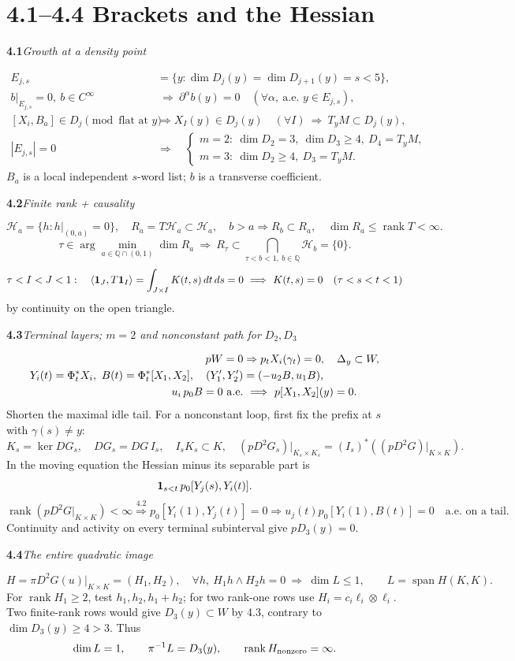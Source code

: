 \documentclass[11pt]{article}
\newcommand{\cH}{\mathcal H}
\newcommand{\rk}{\operatorname{rank}}
\newcommand{\rowhead}[2]{\par\medskip\noindent\textbf{#1}\quad\textit{#2}\par}
\newcommand{\newpart}[1]{\clearpage\section*{#1}}
\begin{document}
\newpart{4.1--4.4 \quad Brackets and the Hessian}
\rowhead{4.1}{Growth at a density point}
\begin{align*}
 E_{j,s}&=\{y:\dim D_j(y)=\dim D_{j+1}(y)=s<5\},\\
 b|_{E_{j,s}}=0,\ b\in C^\infty
 &\ \Longrightarrow\ \partial^\alpha b(y)=0
 \quad(\forall\alpha,\ \text{a.e. }y\in E_{j,s}),\\
 [X_i,B_a]\in D_j\pmod{\text{flat at }y}
 &\Longrightarrow X_I(y)\in D_j(y)\quad(\forall I)
 \ \Longrightarrow\ T_yM\subset D_j(y),\\
 |E_{j,s}|=0\quad&\Longrightarrow\quad
 \begin{cases}
 m=2:\ \dim D_2=3,\ \dim D_3\ge4,\ D_4=T_yM,\\
 m=3:\ \dim D_2\ge4,\ D_3=T_yM .
 \end{cases}
\end{align*}
$B_a$ is a local independent $s$-word list; $b$ is a transverse coefficient.
\rowhead{4.2}{Finite rank + causality}
\[
 \cH_a=\{h:h|_{(0,a)}=0\},\quad R_a=T\cH_a\subset\cH_a,\quad
 b>a\Rightarrow R_b\subset R_a,\quad \dim R_a\le\rk T<\infty .
\]
\[
 \tau\in\arg\min_{a\in\mathbb Q\cap(0,1)}\dim R_a
 \ \Longrightarrow\ R_\tau\subset\bigcap_{\tau<b<1,\ b\in\mathbb Q}\cH_b=\{0\}.
\]
\[
 \tau<I<J<1:\quad\langle{\bf1}_J,T{\bf1}_I\rangle
  =\int_{J\times I} K(t,s)\,dt\,ds=0
  \ \Longrightarrow\ K(t,s)=0\quad(\tau<s<t<1)
\]
by continuity on the open triangle.
\rowhead{4.3}{Terminal layers; $m=2$ and nonconstant path for $D_2,D_3$}
\begin{align*}
 pW=0&\Rightarrow p_tX_i(\gamma_t)=0,\quad \Delta_y\subset W,\\
 Y_i(t)=\Phi_t^*X_i,\ B(t)=\Phi_t^*[X_1,X_2],\quad
 (Y_1',Y_2')&=(-u_2B,u_1B),\\
 u_i\,p_0 B=0\ {\rm a.e.}&\ \Longrightarrow\ p[X_1,X_2](y)=0 .
\end{align*}
Shorten the maximal idle tail. For a nonconstant loop, first fix the prefix at
$s$ with $\gamma(s)\ne y$:
\[
 K_s=\ker DG_s,\quad DG_s=DG\,I_s,\quad I_s K_s\subset K,\quad
 (pD^2G_s)|_{K_s\times K_s}=(I_s)^*((pD^2G)|_{K\times K}).
\]
In the moving equation the Hessian minus its separable part is
\[
 {\bf1}_{s<t}\,p_0[Y_j(s),Y_i(t)] .
\]
\[
 \rk(pD^2G|_{K\times K})<\infty\overset{4.2}{\Longrightarrow}
 p_0[Y_i(1),Y_j(t)]=0
 \Longrightarrow u_j(t)p_0[Y_i(1),B(t)]=0\quad\text{a.e. on a tail}.
\]
Continuity and activity on every terminal subinterval give $pD_3(y)=0$.
\rowhead{4.4}{The entire quadratic image}
\[
 H=\pi D^2G(u)|_{K\times K}=(H_1,H_2),\quad
 \forall h,\ H_1h\wedge H_2h=0
 \ \Longrightarrow\ \dim L\le1,\qquad L=\operatorname{span} H(K,K).
\]
For $\rk H_1\ge2$, test $h_1,h_2,h_1+h_2$; for two rank-one rows use
$H_i=c_i\ell_i\otimes\ell_i$. Two finite-rank rows would give
$D_3(y)\subset W$ by 4.3, contrary to $\dim D_3(y)\ge4>3$. Thus
\[
 \dim L=1,\qquad \pi^{-1}L=D_3(y),\qquad \rk H_{\rm nonzero}=\infty .
\]
\end{document}
